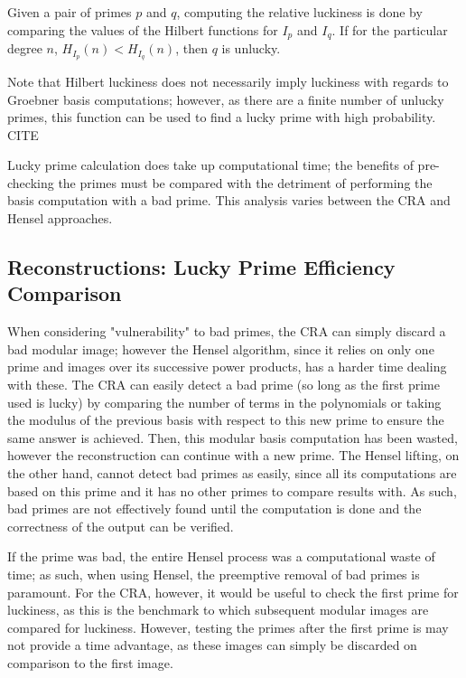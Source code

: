\documentclass[letterpaper,12pt,titlepage,oneside,final]{book}
\begin{document}
Given a pair of primes ${p}$ and ${q}$, computing the relative luckiness is done by comparing the values of the Hilbert functions for ${I_p}$ and ${I_q}$.  If for the particular degree ${n}$, ${H_{I_p}(n) < H_{I_q}(n)}$, then ${q}$ is unlucky.  

Note that Hilbert luckiness does not necessarily imply luckiness with regards to Groebner basis computations; however, as there are a finite number of unlucky primes, this function can be used to find a lucky prime with high probability.  CITE   

Lucky prime calculation does take up computational time; the benefits of pre-checking the primes must be compared with the detriment of performing the basis computation with a bad prime.  This analysis varies between the CRA and Hensel approaches. 

\subsection{Reconstructions: Lucky Prime Efficiency Comparison}

When considering "vulnerability" to bad primes, the CRA can simply discard a bad modular image; however the Hensel algorithm, since it relies on only one prime and images over its successive power products, has a harder time dealing with these.  The CRA can easily detect a bad prime (so long as the first prime used is lucky) by comparing the number of terms in the polynomials or taking the modulus of the previous basis with respect to this new prime to ensure the same answer is achieved.  Then, this modular basis computation has been wasted, however the reconstruction can continue with a new prime.  The Hensel lifting, on the other hand, cannot detect bad primes as easily, since all its computations are based on this prime and it has no other primes to compare results with.  As such, bad primes are not effectively found until the computation is done and the correctness of the output can be verified.  

If the prime was bad, the entire Hensel process was a computational waste of time; as such, when using Hensel, the preemptive removal of bad primes is paramount.  For the CRA, however, it would be useful to check the first prime for luckiness, as this is the benchmark to which subsequent modular images are compared for luckiness.  However, testing the primes after the first prime is may not provide a time advantage, as these images can simply be discarded on comparison to the first image.
\end{document}
